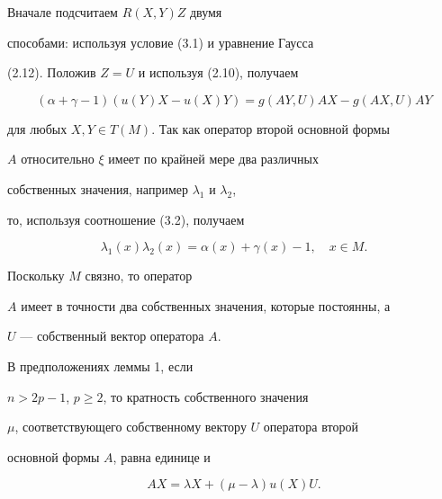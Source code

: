 \begin{pf}


Вначале подсчитаем $R(X,Y)Z$ двумя


способами: используя условие (3.1) и уравнение Гаусса


(2.12). Положив $Z=U$ и используя (2.10), получаем


\begin{equation}


(\alpha+\gamma-1)(u(Y)X-u(X)Y)=g(AY,U)AX-g(AX,U)AY


\end{equation}


для любых $X,Y\in T(M)$. Так как оператор второй основной формы


$A$ относительно $\xi$ имеет по крайней мере два различных


собственных значения, например $\lambda_1$ и $\lambda_2$,


то, используя соотношение (3.2), получаем


$$


\lambda_1(x)\lambda_2(x)=\alpha(x)+\gamma(x)-1, \quad x\in M.


$$


Поскольку $M$ связно, то оператор


$A$ имеет в точности два собственных значения, которые постоянны, а


$U$ --- собственный вектор оператора $A$.


\end{pf}








\begin{notenonum}


В предположениях леммы 1, если


$n>2p-1$, $p\ge 2$, то кратность собственного значения


$\mu$, соответствующего собственному вектору $U$ оператора второй


основной формы $A$, равна единице  и


\begin{equation}


AX=\lambda X+(\mu -\lambda)u(X)U.


\end{equation}


\end{notenonum}






